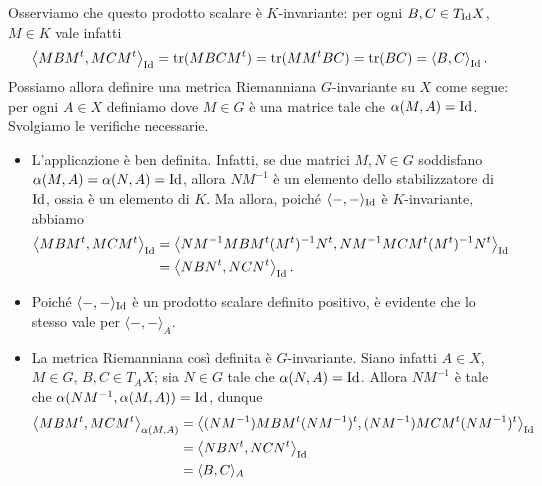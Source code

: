 Osserviamo che questo prodotto scalare è $K$-invariante: per ogni $B,C\in T_{\operatorname{Id}}X$, $M\in K$ vale infatti
\[
\left\langle MBM^t,MCM^t\right\rangle_{\operatorname{Id}}=\operatorname{tr}(MBCM^t)=\operatorname{tr}(MM^tBC)=\operatorname{tr}(BC)=\left\langle B,C\right\rangle_{\operatorname{Id}}.
\]
Possiamo allora definire una metrica Riemanniana $G$-invariante su $X$ come segue: per ogni $A\in X$ definiamo
dove $M\in G$ è una matrice tale che $\alpha(M,A)=\operatorname{Id}$. Svolgiamo le verifiche necessarie.
\begin{itemize}
\item L'applicazione è ben definita. Infatti, se due matrici $M,N\in G$ soddisfano $\alpha(M,A)=\alpha(N,A)=\operatorname{Id}$, allora $NM^{-1}$ è un elemento dello stabilizzatore di $\operatorname{Id}$, ossia è un elemento di $K$. Ma allora, poiché $\langle-,-\rangle_{\operatorname{Id}}$ è $K$-invariante, abbiamo
\begin{align*}
\left\langle MBM^t,MCM^t\right\rangle_{\operatorname{Id}}&=\left\langle NM^{-1}MBM^t(M^t)^{-1}N^t,NM^{-1}MCM^t(M^t)^{-1}N^t\right\rangle_{\operatorname{Id}}\\
&=\left\langle NBN^t,NCN^t\right\rangle_{\operatorname{Id}}.
\end{align*}
\item Poiché $\langle-,-\rangle_{\operatorname{Id}}$ è un prodotto scalare definito positivo, è evidente che lo stesso vale per $\langle-,-\rangle_A$.
\item La metrica Riemanniana così definita è $G$-invariante. Siano infatti $A\in X$, $M\in G$, $B,C\in T_AX$; sia $N\in G$ tale che $\alpha(N,A)=\operatorname{Id}$. Allora $NM^{-1}$ è tale che $\alpha(NM^{-1},\alpha(M,A))=\operatorname{Id}$, dunque
\begin{align*}
\left\langle MBM^t,MCM^t\right\rangle_{\alpha(M,A)}&=\left\langle (NM^{-1})MBM^t(NM^{-1})^t,(NM^{-1})MCM^t(NM^{-1})^t\right\rangle_{\operatorname{Id}}\\
&=\left\langle NBN^t,NCN^t\right\rangle_{\operatorname{Id}}\\
&=\langle B,C\rangle_A
\end{align*}
\end{itemize}


